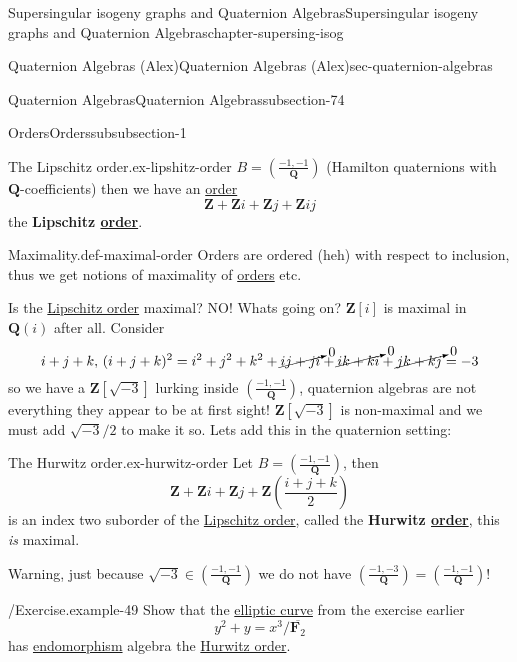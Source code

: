 \documentclass[oneside,10pt,]{book}
\newcommand{\terminology}[1]{\textbf{#1}}
\numberwithin{equation}{section}
\newcommand{\legendre}[2]{\left(\frac{#1}{#2}\right)}
\newcommand{\lb}{[}
\newcommand{\rb}{]}
\newcommand{\ZZ}{\mathbf{Z}}
\newcommand{\QQ}{\mathbf{Q}}
\newcommand{\FF}{\mathbf{F}}
\begin{document}
\begin{chapterptx}{Supersingular isogeny graphs and Quaternion Algebras}{}{Supersingular isogeny graphs and Quaternion Algebras}{}{}{chapter-supersing-isog}
\begin{sectionptx}{Quaternion Algebras (Alex)}{}{Quaternion Algebras (Alex)}{}{}{sec-quaternion-algebras}
\begin{subsectionptx}{Quaternion Algebras}{}{Quaternion Algebras}{}{}{subsection-74}
\begin{subsubsectionptx}{Orders}{}{Orders}{}{}{subsubsection-1}
\begin{example}{The Lipschitz order.}{ex-lipshitz-order}
\hypertarget{p-906}{}%
\(B = \legendre{-1,-1}{\QQ}\) (Hamilton quaternions with \(\QQ\)-coefficients) then we have an \hyperref[def-order-quaternion]{order}%
\begin{equation*}
\ZZ + \ZZ i + \ZZ j + \ZZ ij
\end{equation*}
the \terminology{Lipschitz \hyperref[def-order-quaternion]{order}}.%
\end{example}
\begin{definition}{Maximality.}{def-maximal-order}%
\hypertarget{p-907}{}%
Orders are ordered (heh) with respect to inclusion, thus we get notions of maximality of \hyperref[def-order-quaternion]{orders} etc.%
\end{definition}
\hypertarget{p-908}{}%
Is the \hyperref[ex-lipshitz-order]{Lipschitz order} maximal? NO! Whats going on? \(\ZZ\lb i\rb\) is maximal in \(\QQ(i)\) after all. Consider%
\begin{equation*}
i + j + k,\,(i+j + k)^2 = i^2 + j^2 + k^2 + \cancelto{0}{ij + ji} + \cancelto{0}{ik + ki} + \cancelto{0}{jk + kj} = -3
\end{equation*}
so we have a \(\ZZ\lb \sqrt{-3}\rb\) lurking inside \(\legendre{-1,-1}{\QQ}\), quaternion algebras are not everything they appear to be at first sight! \(\ZZ\lb \sqrt{-3}\rb\) is non-maximal and we must add \(\sqrt{-3}/2\) to make it so. Lets add this in the quaternion setting:%
\begin{example}{The Hurwitz order.}{ex-hurwitz-order}%
\hypertarget{p-909}{}%
Let \(B = \legendre{-1,-1}{\QQ}\), then%
\begin{equation*}
\ZZ+  \ZZ i + \ZZ j + \ZZ \left(\frac{i + j + k}{2}\right)
\end{equation*}
is an index two suborder of the \hyperref[ex-lipshitz-order]{Lipschitz order}, called the \terminology{Hurwitz \hyperref[def-order-quaternion]{order}}, this \emph{is} maximal.%
\end{example}
\hypertarget{p-910}{}%
Warning, just because \(\sqrt{-3} \in \legendre{-1,-1}{\QQ}\) we do not have \(\legendre{-1,-3}{\QQ} = \legendre{-1,-1}{\QQ}\)!%
\begin{example}{/Exercise.}{example-49}%
\hypertarget{p-911}{}%
Show that the \hyperref[def-supersing-isog-ec]{elliptic curve} from the exercise earlier%
\begin{equation*}
y^2 + y = x^3/\overline{\FF_2}
\end{equation*}
has \hyperref[def-supersing-isog-endo]{endomorphism} algebra the \hyperref[ex-hurwitz-order]{Hurwitz order}.%
\par\smallskip%

\end{example}
\end{subsubsectionptx}
\end{subsectionptx}
\end{sectionptx}
\end{chapterptx}
\end{document}
